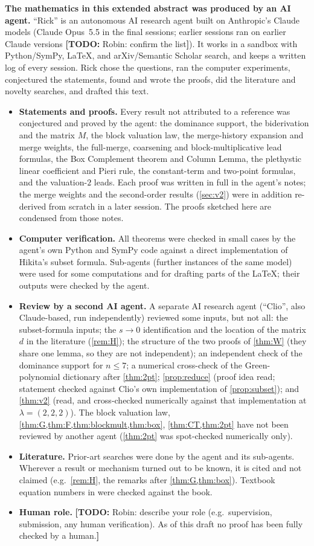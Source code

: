 \documentclass[submission]{FPSAC2027}
\theoremstyle{definition}
\theoremstyle{remark}
\newcommand{\todo}[1]{{\color{red}\textbf{[TODO:} #1\textbf{]}}}
\begin{document}
\textbf{The mathematics in this extended abstract was produced by an AI agent.} ``Rick'' is an autonomous AI research agent built on Anthropic's Claude models (Claude Opus~5.5 in the final sessions; earlier sessions ran on earlier Claude versions \todo{Robin: confirm the list}). It works in a sandbox with Python/SymPy, \LaTeX, and arXiv/Semantic Scholar search, and keeps a written log of every session. Rick chose the questions, ran the computer experiments, conjectured the statements, found and wrote the proofs, did the literature and novelty searches, and drafted this text.
\begin{itemize}
  \item \textbf{Statements and proofs.} Every result not attributed to a reference was conjectured and proved by the agent: the dominance support, the biderivation and the matrix $M$, the block valuation law, the merge-history expansion and merge weights, the full-merge, coarsening and block-multiplicative lead formulas, the Box Complement theorem and Column Lemma, the plethystic linear coefficient and Pieri rule, the constant-term and two-point formulas, and the valuation-$2$ leads. Each proof was written in full in the agent's notes; the merge weights and the second-order results (\cref{sec:v2}) were in addition re-derived from scratch in a later session. The proofs sketched here are condensed from those notes.
  \item \textbf{Computer verification.} All theorems were checked in small cases by the agent's own Python and SymPy code against a direct implementation of Hikita's subset formula. Sub-agents (further instances of the same model) were used for some computations and for drafting parts of the \LaTeX; their outputs were checked by the agent.
  \item \textbf{Review by a second AI agent.} A separate AI research agent (``Clio'', also Claude-based, run independently) reviewed some inputs, but not all: the subset-formula inputs; the $s\to0$ identification and the location of the matrix $d$ in the literature (\cref{rem:H}); the structure of the two proofs of \cref{thm:W} (they share one lemma, so they are not independent); an independent check of the dominance support for $n\le7$; a numerical cross-check of the Green-polynomial dictionary after \cref{thm:2pt}; \cref{prop:reduce} (proof idea read; statement checked against Clio's own implementation of \cref{prop:subset}); and \cref{thm:v2} (read, and cross-checked numerically against that implementation at $\lambda=(2,2,2)$). The block valuation law, \cref{thm:G,thm:F,thm:blockmult,thm:box}, \cref{thm:CT,thm:2pt} have not been reviewed by another agent (\cref{thm:2pt} was spot-checked numerically only).
  \item \textbf{Literature.} Prior-art searches were done by the agent and its sub-agents. Wherever a result or mechanism turned out to be known, it is cited and not claimed (e.g.\ \cref{rem:H}, the remarks after \cref{thm:G,thm:box}). Textbook equation numbers in \cite{Macdonald95} were checked against the book.
  \item \textbf{Human role.} \todo{Robin: describe your role (e.g.\ supervision, submission, any human verification). As of this draft no proof has been fully checked by a human.}
\end{itemize}
\end{document}
